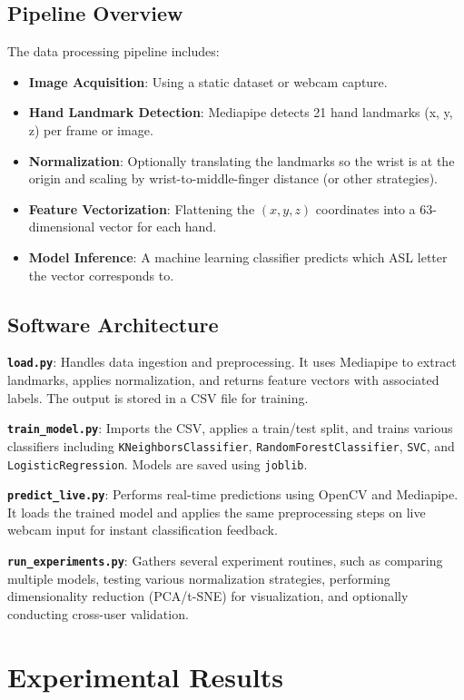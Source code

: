 \documentclass{article}
\begin{document}
\subsection{Pipeline Overview}
The data processing pipeline includes:
\begin{itemize}
    \item \textbf{Image Acquisition}: Using a static dataset or webcam capture.
    \item \textbf{Hand Landmark Detection}: Mediapipe detects 21 hand landmarks (x, y, z) per frame or image.
    \item \textbf{Normalization}: Optionally translating the landmarks so the wrist is at the origin and scaling by wrist-to-middle-finger distance (or other strategies).
    \item \textbf{Feature Vectorization}: Flattening the \((x,y,z)\) coordinates into a 63-dimensional vector for each hand.
    \item \textbf{Model Inference}: A machine learning classifier predicts which ASL letter the vector corresponds to.
\end{itemize}

\subsection{Software Architecture}
\textbf{\texttt{load.py}}: Handles data ingestion and preprocessing. It uses Mediapipe to extract landmarks, applies normalization, and returns feature vectors with associated labels. The output is stored in a CSV file for training.

\textbf{\texttt{train\_model.py}}: Imports the CSV, applies a train/test split, and trains various classifiers including \texttt{KNeighborsClassifier}, \texttt{RandomForestClassifier}, \texttt{SVC}, and \texttt{LogisticRegression}. Models are saved using \texttt{joblib}.

\textbf{\texttt{predict\_live.py}}: Performs real-time predictions using OpenCV and Mediapipe. It loads the trained model and applies the same preprocessing steps on live webcam input for instant classification feedback.

\textbf{\texttt{run\_experiments.py}}: Gathers several experiment routines, such as comparing multiple models, testing various normalization strategies, performing dimensionality reduction (PCA/t-SNE) for visualization, and optionally conducting cross-user validation.

\section{Experimental Results}
\end{document}
